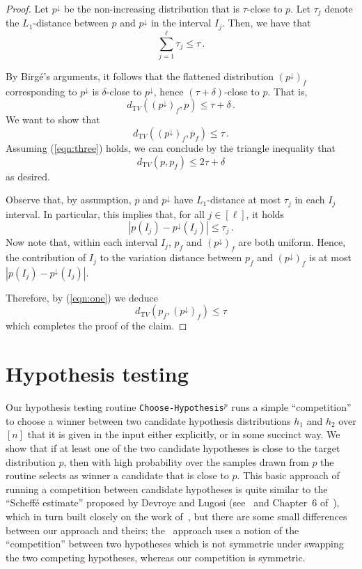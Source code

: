 \documentclass[10pt]{article}
\theoremstyle{definition}
\numberwithin{equation}{section}
\newcommand{\algorithml}[1]{{\normalfont\texttt{#1}}}
\newcommand{\dtv}{d_{\mathrm TV}}
\begin{document}
\begin{proof}
Let $p^{\downarrow}$ be the non-increasing distribution that is $\tau$-close to $p$.
Let $\tau_j$ denote the $L_1$-distance between $p$ and $p^{\downarrow}$ in the interval $I_j$.
Then, we have that
\begin{equation} \label{eqn:one}
\sum_{j=1}^{\ell} \tau_j \leq \tau\,.
\end{equation}

By Birg{\'e}'s arguments, it follows that the flattened distribution $(p^{\downarrow})_f$
corresponding to $p^{\downarrow}$ is $\delta$-close to $p^{\downarrow}$,
hence $(\tau+\delta)$-close to $p$. That is,
\begin{equation} \label{eqn:two}
\dtv \left( (p^{\downarrow})_f, p \right)  \leq \tau+\delta\,.
\end{equation}
We want to show that
\begin{equation} \label{eqn:three}
\dtv \left( (p^{\downarrow})_f, p_f \right) \leq \tau\,.
\end{equation}
Assuming (\ref{eqn:three}) holds, we can conclude by the triangle inequality that
$$\dtv \left(p, p_f \right) \leq 2\tau+\delta$$
as desired.

Observe that, by assumption, $p$ and $p^{\downarrow}$ have
$L_1$-distance at most $\tau_j$ in each $I_j$ interval.
In particular, this implies that, for all $j \in [\ell]$, it holds
$$ \left| p(I_j) - p^{\downarrow}(I_j) \right| \leq \tau_j\,.$$
Now note that, within each interval $I_j$, $p_f$ and $(p^{\downarrow})_f$ are both uniform.
Hence, the contribution of $I_j$ to the variation distance between  $p_f$ and $(p^{\downarrow})_f$
is at most $|p(I_j) - p^{\downarrow}(I_j)|$.

Therefore, by (\ref{eqn:one}) we deduce
$$\dtv (p_f , (p^{\downarrow})_f ) \leq \tau$$
which completes the proof of the claim.
\end{proof}

\section{Hypothesis testing} \label{sec:choosehypothesis}

Our hypothesis testing routine \algorithml{Choose-Hypothesis}$^p$ runs a simple ``competition'' to choose a winner between two candidate hypothesis distributions $h_1$ and $h_2$  over $[n]$ that it is given in the input either explicitly, or in some succinct way.  We show that if at least one of the two candidate hypotheses is close to the target distribution $p$, then with high probability over the samples drawn from $p$ the routine selects as winner a candidate that is close to $p$.
  This basic approach of running a competition between candidate hypotheses is quite similar to the ``Scheff\'e estimate'' proposed by Devroye and Lugosi (see~\cite{DL96,DL97}
and Chapter~6 of~\cite{DL:01}), which in turn built closely on the work of~\cite{Yatracos85}, but
there are some small differences between our approach and theirs; the~\cite{DL:01} approach uses a notion of the ``competition'' between two hypotheses which is not symmetric under swapping the two competing hypotheses, whereas our competition is {symmetric}.
%
\end{document}
